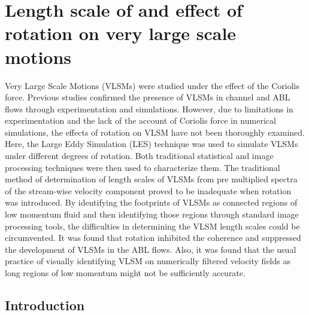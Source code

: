 
\chapter{Length scale of and effect of rotation on very large scale motions}\label{chap:chap1}
Very Large Scale Motions (VLSMs) were studied under  the effect of the Coriolis force. Previous studies confirmed the presence of VLSMs in channel and ABL flows through experimentation and simulations. However, due to limitations in experimentation and the lack of the account of Coriolis force in numerical simulations, the effects of rotation on VLSM have not been thoroughly examined.  Here, the Large Eddy Simulation (LES) technique was used to simulate VLSMs under different degrees of rotation.  Both traditional statistical and image processing  techniques were then used to characterize them. The traditional method of determination of length scales of VLSMs from pre multiplied spectra of the stream-wise velocity component proved to be inadequate when rotation was introduced. By identifying the footprints of VLSMs as connected regions of low momentum fluid and then identifying those regions through standard image processing tools, the difficulties in determining  the VLSM length scales could be circumvented. It was found that rotation inhibited the coherence and suppressed the development of VLSMs in the ABL flows. Also, it was found that the usual practice of visually identifying  VLSM on numerically filtered velocity fields as long regions of low momentum might not be sufficiently accurate. 

\section{Introduction}
\label{intro} 

